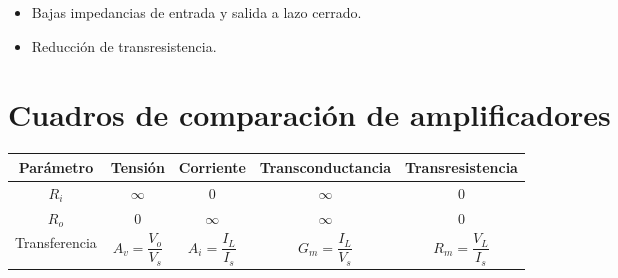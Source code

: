 \begin{itemize}
	\item Bajas impedancias de entrada y salida a lazo cerrado.
	\item Reducción de transresistencia.
\end{itemize}

\section{Cuadros de comparación de amplificadores}

\begin{center}\begin{tabu}{|c|c|c|c|c|} \hline
  Parámetro     & Tensión               & Corriente             & Transconductancia		& Transresistencia      \\ \hline
  $R_i$         & $\infty$              & 0                     & $\infty$              & 0                     \\ \hline
  $R_o$         & 0                     & $\infty$              & $\infty$              & 0                     \\ \hline
  Transferencia & $A_v=\dfrac{V_o}{V_s}$ & $A_i=\dfrac{I_L}{I_s}$ & $G_m=\dfrac{I_L}{V_s}$ & $R_m=\dfrac{V_L}{I_s}$ \\ \hline
\end{tabu}\end{center}
~\\~\\
